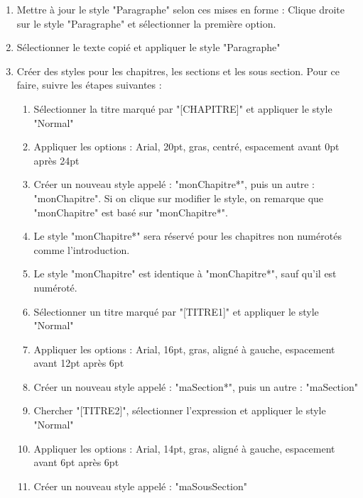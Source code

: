\documentclass[11pt, a4paper]{article}
\begin{document}
\begin{enumerate}
	\item Mettre à jour le style "Paragraphe" selon ces mises en forme : Clique droite sur le style "Paragraphe" et sélectionner la première option.
	\item Sélectionner le texte copié et appliquer le style "Paragraphe"  
	\item Créer des styles pour les chapitres, les sections et les sous section. Pour ce faire, suivre les étapes suivantes : 
	\begin{multicols}{2}
	\begin{enumerate}
		\item Sélectionner  la titre marqué par "[CHAPITRE]" et appliquer le style "Normal" 
		\item Appliquer les options : Arial, 20pt, gras, centré, espacement avant 0pt après 24pt
		\item Créer un nouveau style appelé : "monChapitre*", puis un autre : "monChapitre". Si on clique sur modifier le style, on remarque que "monChapitre" est basé sur "monChapitre*".
		\item Le style "monChapitre*" sera réservé pour les chapitres non numérotés comme l'introduction. 
		\item Le style "monChapitre" est identique à "monChapitre*", sauf qu'il est numéroté.
		\item Sélectionner un titre marqué par "[TITRE1]" et appliquer le style "Normal" 
		\item Appliquer les options : Arial, 16pt, gras, aligné à gauche, espacement avant 12pt après 6pt
		\item Créer un nouveau style appelé : "maSection*", puis un autre : "maSection"
		\item Chercher "[TITRE2]", sélectionner l'expression et appliquer le style "Normal"
		\item Appliquer les options : Arial, 14pt, gras, aligné à gauche, espacement avant 6pt après 6pt
		\item Créer un nouveau style appelé : "maSousSection"
	\end{enumerate}
	\end{multicols}
	

\end{enumerate}
\end{document}

